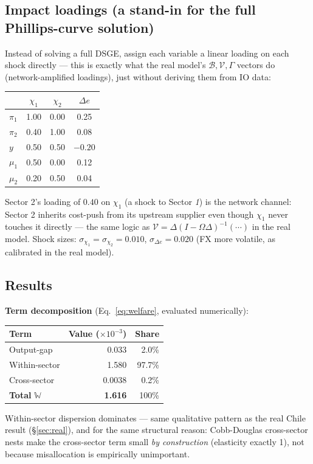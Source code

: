 \documentclass[12pt]{article}
\begin{document}
\subsection{Impact loadings (a stand-in for the full Phillips-curve solution)}
Instead of solving a full DSGE, assign each variable a linear loading on each shock directly —
this is exactly what the real model's $\mathcal{B}, \mathcal{V}, \Gamma$ vectors do (network-amplified
loadings), just without deriving them from IO data:
\begin{center}
\begin{tabular}{lccc}
\toprule
 & $\chi_1$ & $\chi_2$ & $\Delta e$ \\
\midrule
$\pi_1$ & 1.00 & 0.00 & 0.25 \\
$\pi_2$ & 0.40 & 1.00 & 0.08 \\
$y$     & 0.50 & 0.50 & $-0.20$ \\
$\mu_1$ & 0.50 & 0.00 & 0.12 \\
$\mu_2$ & 0.20 & 0.50 & 0.04 \\
\bottomrule
\end{tabular}
\end{center}
Sector 2's loading of $0.40$ on $\chi_1$ (a shock to Sector \emph{1}) is the network channel: Sector 2
inherits cost-push from its upstream supplier even though $\chi_1$ never touches it directly — the
same logic as $\mathcal{V}=\Delta(I-\Omega\Delta)^{-1}(\cdots)$ in the real model. Shock sizes:
$\sigma_{\chi_1}=\sigma_{\chi_2}=0.010$, $\sigma_{\Delta e}=0.020$ (FX more volatile, as calibrated
in the real model).

\subsection{Results}

\textbf{Term decomposition} (Eq.~\ref{eq:welfare}, evaluated numerically):
\begin{center}
\begin{tabular}{lrr}
\toprule
Term & Value ($\times10^{-3}$) & Share \\
\midrule
Output-gap & 0.033 & 2.0\% \\
Within-sector & 1.580 & 97.7\% \\
\quad Cross-sector & 0.0038 & 0.2\% \\
\midrule
\textbf{Total} $\mathbb{W}$ & \textbf{1.616} & 100\% \\
\bottomrule
\end{tabular}
\end{center}
Within-sector dispersion dominates — same qualitative pattern as the real Chile result
(\S\ref{sec:real}), and for the same structural reason: Cobb-Douglas cross-sector nests make the
cross-sector term small \emph{by construction} (elasticity exactly 1), not because misallocation is
empirically unimportant.
\end{document}
